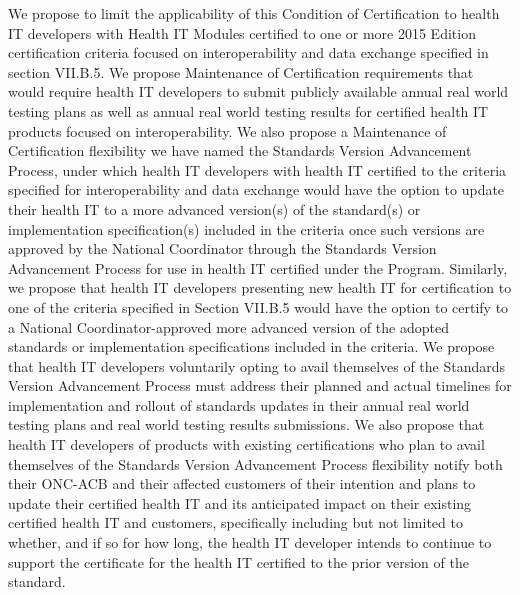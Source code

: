 \documentclass[twoside,11pt]{article}
\begin{document}
          We propose to limit the applicability of this Condition of Certification to health IT developers with Health IT Modules certified to one or more 2015 Edition certification criteria focused on interoperability and data exchange specified in section VII.B.5. We propose Maintenance of Certification requirements that would require health IT developers to submit publicly available annual real world testing plans as well as annual real world testing results for certified health IT products focused on interoperability. We also propose a Maintenance of Certification flexibility we have named the Standards Version Advancement Process, under which health IT developers with health IT certified to the criteria specified for interoperability and data exchange would have the option to update their health IT to a more advanced version(s) of the standard(s) or implementation specification(s) included in the criteria once such versions are approved by the National Coordinator through the Standards Version Advancement Process for use in health IT certified under the Program. Similarly, we propose that health IT developers presenting new health IT for certification to one of the criteria specified in Section VII.B.5 would have the option to certify to a National Coordinator-approved more advanced version of the adopted standards or implementation specifications included in the criteria. We propose that health IT developers voluntarily opting to avail themselves of the Standards Version Advancement Process must address their planned and actual timelines for implementation and rollout of standards updates in their annual real world testing plans and real world testing results submissions. We also propose that health IT developers of products with existing certifications who plan to avail themselves of the Standards Version Advancement Process flexibility notify both their ONC-ACB and their affected customers of their intention and plans to update their certified health IT and its anticipated impact on their existing certified health IT and customers, specifically including but not limited to whether, and if so for how long, the health IT developer intends to continue to support the certificate for the health IT certified to the prior version of the standard.
\end{document}
